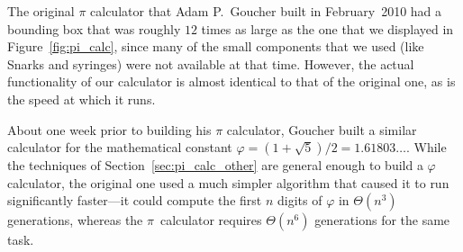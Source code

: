 The original $\pi$ calculator that Adam P.~Goucher built in February~2010 had a bounding box that was roughly $12$ times as large as the one that we displayed in Figure~\ref{fig:pi_calc}, since many of the small components that we used (like Snarks and syringes) were not available at that time. However, the actual functionality of our calculator is almost identical to that of the original one, as is the speed at which it runs.

About one week prior to building his $\pi$ calculator, Goucher built a similar calculator for the mathematical constant $\varphi = (1+\sqrt{5})/2 = 1.61803\ldots$. While the techniques of Section~\ref{sec:pi_calc_other} are general enough to build a $\varphi$ calculator, the original one used a much simpler algorithm that caused it to run significantly faster---it could compute the first $n$ digits of $\varphi$ in $\Theta(n^3)$ generations, whereas the $\pi$~calculator requires $\Theta(n^6)$ generations for the same task.




